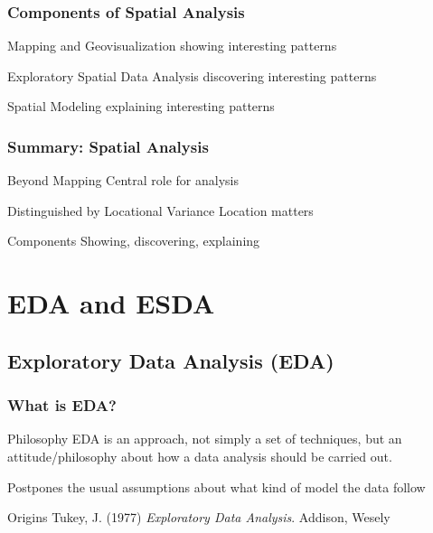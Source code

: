 \documentclass[nototal]{beamer}
\begin{document}
\begin{frame}
	\frametitle{Components of Spatial Analysis}
 
\begin{block}{Mapping and Geovisualization}
  \alert{showing} interesting patterns
 \end{block} 
\begin{block}{Exploratory Spatial Data Analysis}
  \alert{discovering} interesting patterns
 \end{block} 
\begin{block}{Spatial Modeling}
  \alert{explaining} interesting patterns
 \end{block} \end{frame} 

\begin{frame}
	\frametitle{Summary: Spatial Analysis}
 
\begin{block}{Beyond Mapping}
  Central role for \alert{analysis}
 \end{block} 
\begin{block}{Distinguished by Locational Variance}
  \alert{Location} matters
 \end{block} 
\begin{block}{Components}
  Showing, discovering, explaining
 \end{block} \end{frame} 


\section{EDA and ESDA} 

\subsection{Exploratory Data Analysis (EDA)} 

\begin{frame}
	\frametitle{What is EDA?}
 
\begin{block}{Philosophy}
  EDA is an approach, not simply a set of techniques, but an
  attitude/philosophy about how a data analysis should be carried
  out.
 
 Postpones the usual assumptions about what kind of model the data follow
 \end{block} 
\begin{block}{Origins}
  Tukey, J. (1977) \emph{Exploratory Data Analysis}. Addison,
  Wesely
 \end{block} \end{frame} 
\end{document}
